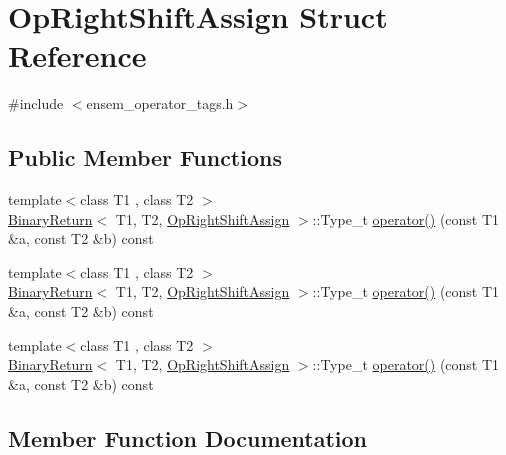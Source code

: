\hypertarget{structOpRightShiftAssign}{}\section{Op\+Right\+Shift\+Assign Struct Reference}
\label{structOpRightShiftAssign}


{\ttfamily \#include $<$ensem\+\_\+operator\+\_\+tags.\+h$>$}

\subsection*{Public Member Functions}
\begin{DoxyCompactItemize}
\item 
{\footnotesize template$<$class T1 , class T2 $>$ }\\\mbox{\hyperlink{structBinaryReturn}{Binary\+Return}}$<$ T1, T2, \mbox{\hyperlink{structOpRightShiftAssign}{Op\+Right\+Shift\+Assign}} $>$\+::Type\+\_\+t \mbox{\hyperlink{structOpRightShiftAssign_aadcc045ee32dcfceb41c254bec68ef3c}{operator()}} (const T1 \&a, const T2 \&b) const
\item 
{\footnotesize template$<$class T1 , class T2 $>$ }\\\mbox{\hyperlink{structBinaryReturn}{Binary\+Return}}$<$ T1, T2, \mbox{\hyperlink{structOpRightShiftAssign}{Op\+Right\+Shift\+Assign}} $>$\+::Type\+\_\+t \mbox{\hyperlink{structOpRightShiftAssign_aadcc045ee32dcfceb41c254bec68ef3c}{operator()}} (const T1 \&a, const T2 \&b) const
\item 
{\footnotesize template$<$class T1 , class T2 $>$ }\\\mbox{\hyperlink{structBinaryReturn}{Binary\+Return}}$<$ T1, T2, \mbox{\hyperlink{structOpRightShiftAssign}{Op\+Right\+Shift\+Assign}} $>$\+::Type\+\_\+t \mbox{\hyperlink{structOpRightShiftAssign_aadcc045ee32dcfceb41c254bec68ef3c}{operator()}} (const T1 \&a, const T2 \&b) const
\end{DoxyCompactItemize}


\subsection{Member Function Documentation}
\mbox{\label{structOpRightShiftAssign_aadcc045ee32dcfceb41c254bec68ef3c}} 
